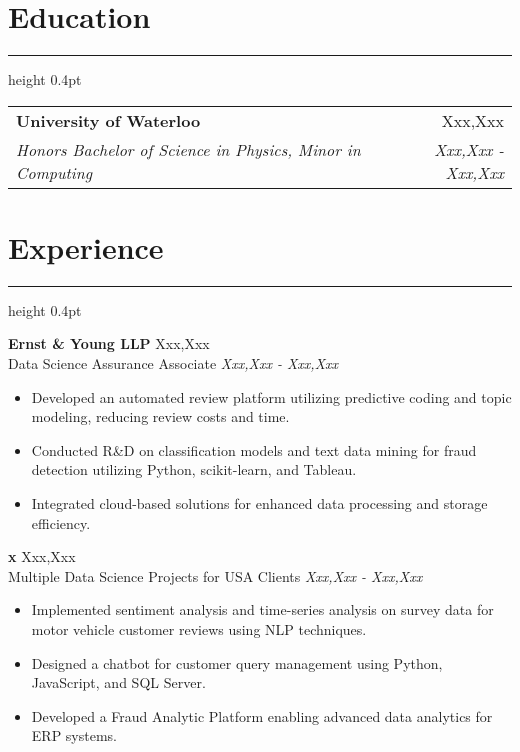 \documentclass[a4paper,9pt]{article}
\newcommand{\sectionrule}{
    \vspace{0.5em}
    \hrule height 0.4pt
    \vspace{0.5em}
}
\begin{document}
\section*{\Large Education}
\sectionrule
\noindent
\begin{tabular*}{\textwidth}{@{\extracolsep{\fill}} l r}
\textbf{University of Waterloo} & Xxx,Xxx \\
\textit{Honors Bachelor of Science in Physics, Minor in Computing} & \textit{Xxx,Xxx - Xxx,Xxx} \\
\end{tabular*}

\vspace{0.8em}

\section*{\Large Experience}
\sectionrule
\noindent
\textbf{Ernst \& Young LLP} \hfill Xxx,Xxx \\
Data Science Assurance Associate \hfill \textit{Xxx,Xxx - Xxx,Xxx}
\begin{itemize}
    \item Developed an automated review platform utilizing predictive coding and topic modeling, reducing review costs and time.
    \item Conducted R\&D on classification models and text data mining for fraud detection utilizing Python, scikit-learn, and Tableau.
    \item Integrated cloud-based solutions for enhanced data processing and storage efficiency.
\end{itemize}

\vspace{0.8em}

\noindent
\textbf{x} \hfill Xxx,Xxx \\
Multiple Data Science Projects for USA Clients \hfill \textit{Xxx,Xxx - Xxx,Xxx}
\begin{itemize}
    \item Implemented sentiment analysis and time-series analysis on survey data for motor vehicle customer reviews using NLP techniques.
    \item Designed a chatbot for customer query management using Python, JavaScript, and SQL Server.
    \item Developed a Fraud Analytic Platform enabling advanced data analytics for ERP systems.
\end{itemize}
\end{document}
